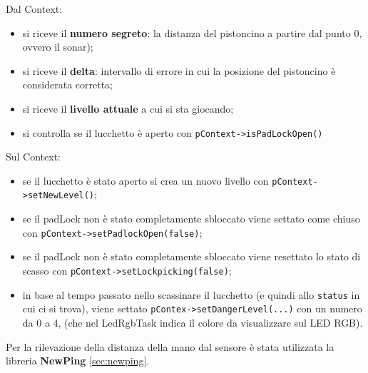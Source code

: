 Dal Context:
\begin{itemize}
	\item si riceve il \textbf{numero segreto}: la distanza del pistoncino a partire dal punto 0, ovvero il sonar);
	\item si riceve il \textbf{delta}: intervallo di errore in cui la posizione del pistoncino è considerata corretta;
	\item si riceve il \textbf{livello attuale} a cui si sta giocando;
	\item si controlla se il lucchetto è aperto con \texttt{pContext->isPadLockOpen()}
\end{itemize}
Sul Context:
\begin{itemize}
	\item se il lucchetto è stato aperto si crea un nuovo livello con \texttt{pContext->setNewLevel()};
	\item se il padLock non è stato completamente sbloccato viene settato come chiuso con \texttt{pContext->setPadlockOpen(false)};
	\item se il padLock non è stato completamente sbloccato viene resettato lo stato di scasso con \texttt{pContext->setLockpicking(false)};
	\item in base al tempo passato nello scassinare il lucchetto (e quindi allo \texttt{status} in cui ci si trova), viene settato \texttt{pContex->setDangerLevel(...)} con un numero da 0 a 4, (che nel LedRgbTask indica il colore da visualizzare sul LED RGB).
\end{itemize}
Per la rilevazione della distanza della mano dal sensore è stata utilizzata la libreria \textbf{NewPing} \ref{sec:newping}.
